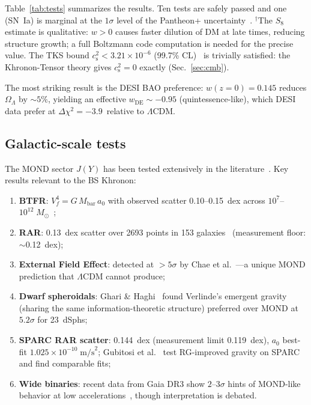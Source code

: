 \documentclass[prd,twocolumn,superscriptaddress,longbibliography,floatfix]{revtex4-2}
\newcommand{\Msun}{M_\odot}
\newcommand{\cs}{c_{\mathrm{s}}}
\begin{document}
Table~\ref{tab:tests} summarizes the results.  Ten tests are
safely passed and one (SN~Ia) is marginal at the $1\sigma$ level
of the Pantheon+ uncertainty~\cite{Pantheon2022}.
$^{\dag}$The $S_8$ estimate is qualitative: $w > 0$ causes
faster dilution of DM at late times, reducing structure growth;
a full Boltzmann code computation is needed for the precise value.
The TKS bound $\cs^2 < 3.21 \times 10^{-6}$ (99.7\% CL)~\cite{TKS2016}
is trivially satisfied: the Khronon-Tensor theory gives $\cs^2 = 0$
exactly (Sec.~\ref{sec:cmb}).

The most striking result is the DESI BAO preference:
$w(z{=}0) = 0.145$ reduces $\Omega_\Lambda$ by $\sim\!5\%$,
yielding an effective $w_{\mathrm{DE}} \sim -0.95$
(quintessence-like), which DESI data prefer at
$\Delta\chi^2 = -3.9$~relative to $\Lambda$CDM.

\subsection{Galactic-scale tests}

The MOND sector $J(Y)$ has been tested extensively in the
literature~\cite{FamaeyMcGaugh2012,Lelli2017,SPARC2016}.
Key results relevant to the BS Khronon:

\begin{enumerate}
\item \textbf{BTFR}: $V_f^4 = G\,M_{\mathrm{bar}}\,a_0$ with
  observed scatter 0.10--0.15~dex across
  $10^7$--$10^{12}\;\Msun$~\cite{McGaugh2012,Lelli2019};
\item \textbf{RAR}: 0.13~dex scatter over 2693 points in 153
  galaxies~\cite{McGaugh2016RAR} (measurement floor:
  $\sim$0.12~dex);
\item \textbf{External Field Effect}: detected at $>5\sigma$
  by Chae et al.~\cite{Chae2020}---a unique MOND prediction
  that $\Lambda$CDM cannot produce;
\item \textbf{Dwarf spheroidals}: Ghari \&
  Haghi~\cite{GhariHaghi2026} found Verlinde's emergent gravity
  (sharing the same information-theoretic structure) preferred
  over MOND at $5.2\sigma$ for 23~dSphs;
\item \textbf{SPARC RAR scatter}: 0.144~dex (measurement
  limit 0.119~dex), $a_0$ best-fit
  $1.025 \times 10^{-10}\;\mathrm{m/s}^2$;
  Gubitosi et al.~\cite{Gubitosi2024} test RG-improved gravity
  on SPARC and find comparable fits;
\item \textbf{Wide binaries}: recent data from Gaia DR3 show
  $2$--$3\sigma$ hints of MOND-like behavior at low
  accelerations~\cite{Chae2024WB}, though interpretation is
  debated.
\end{enumerate}
\end{document}
